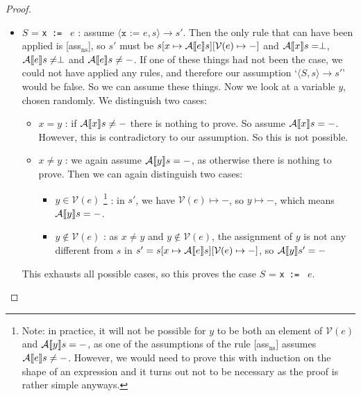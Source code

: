 \begin{proof}
\begin{itemize}[noitemsep]
    \item $S$ = \texttt{x := } $e$ : assume $\langle \texttt{x := } e, s \rangle \to s'$. Then the only rule that can have been applied is [ass$_{\textrm{ns}}$], so  $s'$ must be $s[x \mapsto \mathcal{A} \llbracket e \rrbracket s][\mathcal{V}(e)\mapsto-]$ and $\mathcal{A} \llbracket x \rrbracket s = \perp$, $\mathcal{A} \llbracket e \rrbracket s \neq \perp$ and $\mathcal{A} \llbracket e \rrbracket s \neq -$. If one of these things had not been the case, we could not have applied any rules, and therefore our assumption `$\langle S, s \rangle \to s'$' would be false. So we can assume these things. Now we look at a variable $y$, chosen randomly. We distinguish two cases:
    \begin{itemize}
        \item $x=y$ : if $\mathcal{A} \llbracket x \rrbracket s \not = -$ there is nothing to prove. So assume $\mathcal{A} \llbracket x \rrbracket s = -$. However, this is contradictory to our assumption. So this is not possible.
        \item $x\not = y$ : we again assume $\mathcal{A} \llbracket y \rrbracket s = -$, as otherwise there is nothing to prove. Then we can again distinguish two cases: 
        \begin{itemize}
            \item $y \in \mathcal{V}(e)$ \footnote{Note: in practice, it will not be possible for $y$ to be both an element of $\mathcal{V}(e)$ and $\mathcal{A} \llbracket y \rrbracket s = -$, as one of the assumptions of the rule [ass$_{\textrm{ns}}$] assumes $\mathcal{A} \llbracket e \rrbracket s \neq -$. However, we would need to prove this with induction on the shape of an expression and it turns out not to be necessary as the proof is rather simple anyways.} : in $s'$, we have $\mathcal{V}(e)\mapsto-$, so $y \mapsto -$, which means $\mathcal{A} \llbracket y \rrbracket s = -$.
            \item $y \not \in \mathcal{V}(e)$ : as $x \not = y$ and $y \not \in \mathcal{V}(e)$, the assignment of $y$ is not any different from $s$ in $s'=s[x \mapsto \mathcal{A} \llbracket e \rrbracket s][\mathcal{V}(e)\mapsto-]$, so $\mathcal{A} \llbracket y \rrbracket s' = -$
        \end{itemize}
    \end{itemize}
    This exhausts all possible cases, so this proves the case $S$ = \texttt{x := } $e$.
    

\end{itemize}
\end{proof}
